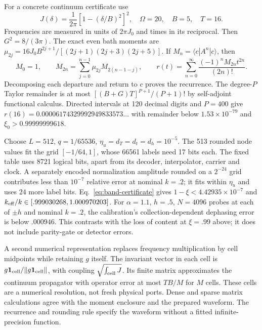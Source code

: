 \documentclass[aps,pre,onecolumn,superscriptaddress,floatfix,longbibliography]{revtex4-2}
\begin{document}
For a concrete continuum certificate use
\[
 J(\delta)=\frac1{2\pi}\left[1-(\delta/B)^2\right]^2,
 \quad \Omega=20,\quad B=5,\quad T=16.
\]
Frequencies are measured in units of $2\pi J_0$ and times in its reciprocal.
Then $G^2=8/(3\pi)$. The exact even bath moments are
$\mu_{2j}=16J_0B^{2j+1}/[(2j+1)(2j+3)(2j+5)]$.
If $M_n=\langle c|A^n|c\rangle$, then
\[
 M_0=1,\qquad M_{2n}=\sum_{j=0}^{n-1}\mu_{2j}M_{2(n-1-j)},
 \qquad r(t)=\sum_{n=0}^\infty
             \frac{(-1)^nM_{2n}t^{2n}}{(2n)!}.
\]
Decomposing each departure and return to $c$ proves the recurrence.
The degree-$P$ Taylor remainder is at most
$[(B+G)T]^{P+1}/(P+1)!$ by self-adjoint functional calculus.
Directed intervals at 120 decimal digits and $P=400$ give
$r(16)=0.00006174329992949833573\ldots$ with remainder below
$1.53\times10^{-79}$ and $\xi_0>0.99999999618$.

Choose $L=512$, $q=1/65536$, $\eta_u=d_T=d_t=d_h=10^{-5}$.
The 513 rounded node values fit the grid $[-1/64,1]$, whose 66561 labels
need 17 bits each. The fixed table uses 8721 logical bits, apart from its
decoder, interpolator, carrier and clock. A separately encoded normalization
amplitude rounded on a $2^{-24}$ grid contributes less than $10^{-7}$
relative error at nominal $k=.2$; it fits within $\eta_u$ and uses 24 more
label bits. Eq.~\eqref{eq:band-certificate}
gives $1-\xi<4.42935\times10^{-7}$ and
$k_{\rm eff}/k\in[.999030268,1.000970203]$.
For $\alpha=1.1$, $h=.5$, $N=4096$ probes at each of $\pm h$ and
nominal $k=.2$, the calibration's collection-dependent dephasing error
is below $.000946$. This contrasts with the loss of content at $\xi=.99$
above; it does not include parity-gate or detector errors.

A second numerical representation replaces frequency multiplication by
cell midpoints while retaining $g$ itself. The invariant vector in each cell
is $g\mathbf1_{\rm cell}/\|g\mathbf1_{\rm cell}\|$, with coupling
$\sqrt{\int_{\rm cell}J}$. Its finite matrix approximates the continuum
propagator with operator error at most $TB/M$ for $M$ cells. These cells
are a numerical resolution, not fresh physical ports. Dense
and sparse matrix calculations agree with the moment enclosure and the prepared
waveform. The recurrence and rounding rule specify the waveform without a
fitted infinite-precision function.
\end{document}
